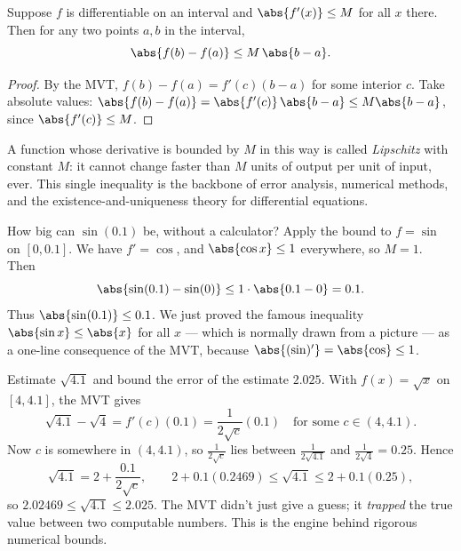 \begin{corollary}\label{ch15:cor-bound}
Suppose $f$ is differentiable on an interval and $\abs{f'(x)}\le M$ for all $x$
there. Then for any two points $a,b$ in the interval,
\[
  \abs{f(b)-f(a)}\le M\,\abs{b-a}.
\]
\end{corollary}

\begin{proof}
By the MVT, $f(b)-f(a)=f'(c)(b-a)$ for some interior $c$. Take absolute values:
$\abs{f(b)-f(a)}=\abs{f'(c)}\,\abs{b-a}\le M\abs{b-a}$, since $\abs{f'(c)}\le M$.
\end{proof}

A function whose derivative is bounded by $M$ in this way is called
\emph{Lipschitz} with constant $M$: it cannot change faster than $M$ units of output
per unit of input, ever. This single inequality is the backbone of error analysis,
numerical methods, and the existence-and-uniqueness theory for differential
equations.

\begin{example}\label{ch15:ex-sin-bound}
How big can $\sin(0.1)$ be, without a calculator? Apply the bound to $f=\sin$ on
$[0,0.1]$. We have $f'=\cos$, and $\abs{\cos x}\le 1$ everywhere, so $M=1$. Then
\[
  \abs{\sin(0.1)-\sin(0)}\le 1\cdot\abs{0.1-0}=0.1.
\]
Thus $\abs{\sin(0.1)}\le 0.1$. We just proved the famous inequality
$\abs{\sin x}\le \abs{x}$ for all $x$ --- which is normally drawn from a picture ---
as a one-line consequence of the MVT, because $\abs{(\sin)'}=\abs{\cos}\le 1$.
\end{example}

\begin{example}\label{ch15:ex-sqrt-bound}
Estimate $\sqrt{4.1}$ and bound the error of the estimate $2.025$. With
$f(x)=\sqrt x$ on $[4,4.1]$, the MVT gives
\[
  \sqrt{4.1}-\sqrt 4=f'(c)(0.1)=\frac{1}{2\sqrt c}(0.1)
  \quad\text{for some }c\in(4,4.1).
\]
Now $c$ is somewhere in $(4,4.1)$, so $\frac{1}{2\sqrt c}$ lies between
$\frac{1}{2\sqrt{4.1}}$ and $\frac{1}{2\sqrt 4}=0.25$. Hence
\[
  \sqrt{4.1}=2+\frac{0.1}{2\sqrt c}, \qquad
  2+0.1(0.2469)\le \sqrt{4.1}\le 2+0.1(0.25),
\]
so $2.02469\le \sqrt{4.1}\le 2.025$. The MVT didn't just give a guess; it
\emph{trapped} the true value between two computable numbers. This is the engine
behind rigorous numerical bounds.
\end{example}

